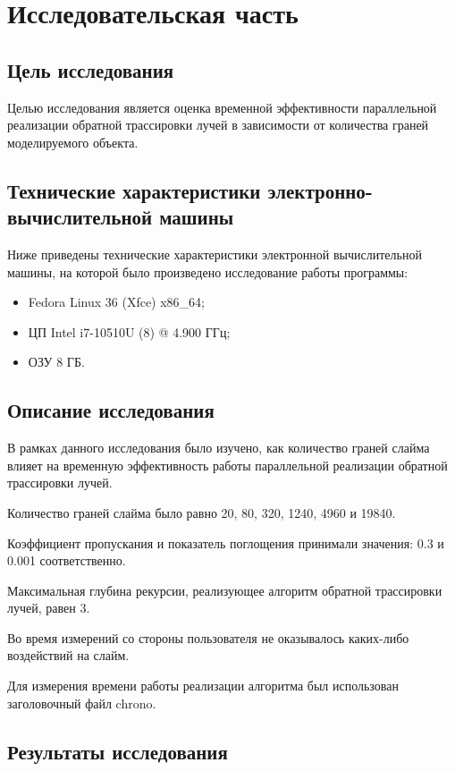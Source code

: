 \chapter{Исследовательская часть}

\section{Цель исследования}

Целью исследования является оценка временной эффективности параллельной реализации обратной трассировки лучей в зависимости от количества граней моделируемого объекта.

\section{Технические характеристики электронно-вычислительной машины}

Ниже приведены технические характеристики электронной вычислительной машины, на которой было произведено исследование работы программы:

\begin{itemize}
	\item Fedora Linux 36 (Xfce) x86\_64;
	\item ЦП Intel i7-10510U (8) @ 4.900 ГГц;
	\item ОЗУ 8 ГБ.
\end{itemize}

\section{Описание исследования}

В рамках данного исследования было изучено, как количество граней слайма влияет на временную эффективность работы параллельной реализации обратной трассировки лучей. 

Количество граней слайма было равно 20, 80, 320, 1240, 4960 и 19840.

Коэффициент пропускания и показатель поглощения принимали значения: 0.3 и 0.001 соответственно.

Максимальная глубина рекурсии, реализующее алгоритм обратной трассировки лучей, равен 3.

Во время измерений со стороны пользователя не оказывалось каких-либо воздействий на слайм.

Для измерения времени работы реализации алгоритма был использован заголовочный файл chrono.

\section{Результаты исследования}

